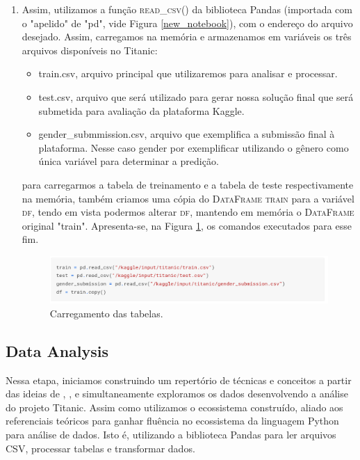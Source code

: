 \documentclass{article}
\begin{document}
\begin{enumerate}
    \item Assim, utilizamos a função \textsc{read\_csv()} da biblioteca Pandas (importada com o "apelido" de "pd", vide Figura \ref{new_notebook}), com o endereço do arquivo desejado.
    Assim, carregamos na memória e armazenamos em variáveis os três arquivos disponíveis no Titanic: 
    \begin{itemize}
        \item train.csv, arquivo principal que utilizaremos para analisar e processar.
        \item test.csv, arquivo que será utilizado para gerar nossa solução final que será submetida para avaliação da plataforma Kaggle.
        \item gender\_submmission.csv, arquivo que exemplifica a submissão final à plataforma. Nesse caso gender por exemplificar utilizando o gênero como única variável para determinar a predição. 
    \end{itemize}
    
    
    para carregarmos a tabela de treinamento e a tabela de teste respectivamente na memória, também criamos uma cópia do \textsc{DataFrame} \textsc{train} para a variável \textsc{df}, tendo em vista podermos alterar \textsc{df}, mantendo em memória o \textsc{DataFrame} original "train".
    Apresenta-se, na Figura \ref{read_csv}, os comandos executados para esse fim. 
    
    \begin{figure}[H]
     \centering
     \includegraphics[width=\textwidth]{Figures/read_csv.png}
     \caption{\label{read_csv}Carregamento das tabelas.}
    \end{figure}
\end{enumerate}

\subsection{Data Analysis}\label{Data Analysis}
Nessa etapa, iniciamos construindo um repertório de técnicas e conceitos a partir das ideias de \cite{DATAPYTHON}, \cite{BATON}, e simultaneamente exploramos os dados desenvolvendo a análise do projeto Titanic. Assim como utilizamos o ecossistema construído, aliado aos referenciais teóricos para ganhar fluência no ecossistema da linguagem Python para análise de dados. Isto é, utilizando a biblioteca Pandas para ler arquivos CSV, processar tabelas e transformar dados. 
\end{document}
